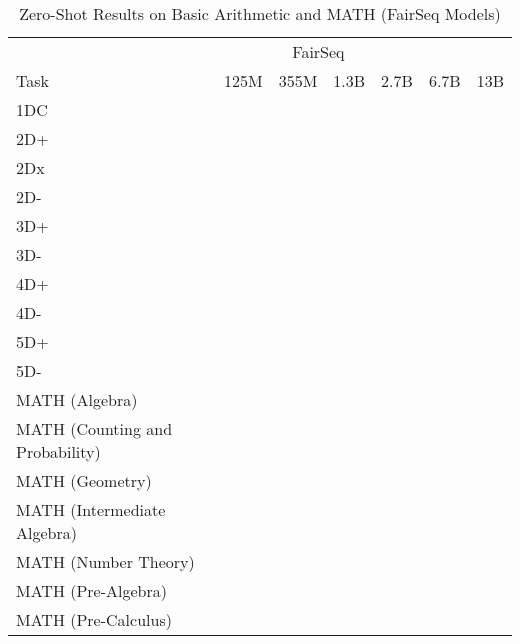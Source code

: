 \documentclass[11pt]{article}
\begin{document}
{\begin{landscape}
\begin{table*}
\centering \begin{tabular}{l c c c c c c } \\ 
& \multicolumn{4}{c}{FairSeq} \\ 
Task & 125M & 355M & 1.3B & 2.7B & 6.7B & 13B \\ \toprule
1DC &  &  &  &  &  &  \\ 
2D+ &  &  &  &  &  &  \\ 
2Dx &  &  &  &  &  &  \\ 
2D- &  &  &  &  &  &  \\ 
3D+ &  &  &  &  &  &  \\ 
3D- &  &  &  &  &  &  \\ 
4D+ &  &  &  &  &  &  \\ 
4D- &  &  &  &  &  &  \\ 
5D+ &  &  &  &  &  &  \\ 
5D- &  &  &  &  &  &  \\ 
MATH (Algebra) &  &  &  &  &  &  \\ 
MATH (Counting and Probability) &  &  &  &  &  &  \\ 
MATH (Geometry) &  &  &  &  &  &  \\ 
MATH (Intermediate Algebra) &  &  &  &  &  &  \\ 
MATH (Number Theory) &  &  &  &  &  &  \\ 
MATH (Pre-Algebra) &  &  &  &  &  &  \\ 
MATH (Pre-Calculus) &  &  &  &  &  &  \\ 
\bottomrule 
\end{tabular}
\caption{Zero-Shot Results on Basic Arithmetic and MATH (FairSeq Models)}
\label{tab:math_fairseq}
\end{table*}





\end{landscape}}
\end{document}
